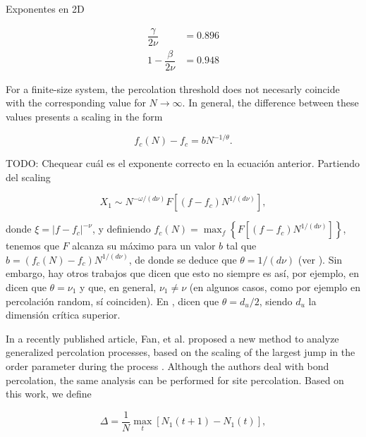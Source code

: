 \documentclass{article}
\begin{document}


Exponentes en 2D

\begin{align}
\dfrac{\gamma}{2\nu} &= 0.896 \\
1-\dfrac{\beta}{2\nu} &= 0.948
\end{align}

For a finite-size system, the percolation threshold does not necesarly coincide with the corresponding value for $N\rightarrow \infty$. In general, the difference between these values presents a scaling in the form

\begin{equation} \label{eq:peak_pos_shift}
f_c(N) - f_c = b N^{-1/\theta}.
\end{equation}

TODO: Chequear cu\'al es el exponente correcto en la ecuaci\'on anterior. Partiendo del scaling

\begin{equation}
X_1 \sim N^{-\omega/(d\nu)} F[(f-f_c)N^{1/(d\nu)}],
\end{equation}

donde $\xi = |f-f_c|^{-\nu}$,
y definiendo $f_c(N) = \max_{f} \left\lbrace F[(f-f_c)N^{1/(d\nu)}] \right\rbrace$, tenemos que $F$ alcanza su m\'aximo para un valor $b$ tal que $b = (f_c(N)-f_c) N^{1/(d\nu)}$, de donde se deduce que $\theta = 1/(d\nu)$ (ver \cite{Ziff2010ScalingLattice,Cho2009}).
Sin embargo, hay otros trabajos que dicen que esto no siempre es as\'i, por ejemplo, en \cite{Fan2020} dicen que $\theta = \nu_1$ y que, en general, $\nu_1 \neq \nu$ (en algunos casos, como por ejemplo en percolaci\'on random, s\'i coinciden). En \cite{DaCosta2010}, dicen que $\theta = d_u/2$, siendo $d_u$ la dimensi\'on cr\'itica superior.

In a recently published article, Fan, et al. proposed a new method to analyze generalized percolation processes, based on the scaling of the largest jump in the order parameter during the process \cite{Fan2020}. Although the authors deal with bond percolation, the same analysis can be performed for site percolation. Based on this work, we define 

\begin{equation} \label{eq:Delta}
\Delta = \dfrac{1}{N} \max_{t} \left[ N_1(t+1) - N_1(t) \right],
\end{equation} 
\end{document}

